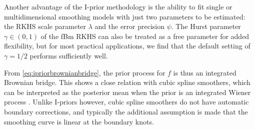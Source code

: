 

Another advantage of the I-prior methodology is the ability to fit single or multidimensional smoothing models with just two parameters to be estimated: the RKHS scale parameter $\lambda$ and the error precision $\psi$.
The Hurst parameter $\gamma \in (0,1)$ of the fBm RKHS can also be treated as a free parameter for added flexibility, but for most practical applications, we find that the default setting of $\gamma = 1/2$ performs sufficiently well.

\begin{remark}\label{rem:ipriorIBM}
  From \cref{eq:ipriorbrownianbridge}, the prior process for $f$ is thus an integrated Brownian bridge. 
  This shows a close relation with cubic spline smoothers, which can be interpreted as the posterior mean when the prior is an integrated Wiener process \citep{wahba1990spline}.
  Unlike I-priors however, cubic spline smoothers do not have automatic boundary corrections, and typically the additional assumption is made that the smoothing curve is linear at the boundary knots.
\end{remark}

